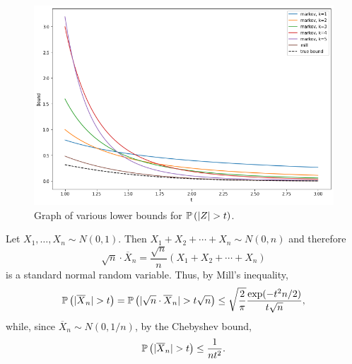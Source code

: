 \begin{ex}
  \inputminted{python}{src/04-06.py}

  \begin{figure}[H]
    \centering
    \includegraphics[scale=0.58]{part1/ch04-06}
    \caption{Graph of various lower bounds for $\P{|Z|>t}$.}
  \end{figure}
\end{ex}

\begin{ex}
  Let $X_1,\ldots,X_n\sim N(0,1)$. Then $X_1+X_2+\cdots+X_n\sim N(0, n)$ and
  therefore
  \[
    \sqrt{n}\cdot \overline{X}_n=\frac{\sqrt{n}}{n}\left(X_1+X_2+\cdots+X_n\right)
  \]
  is a standard normal random variable. Thus, by Mill's inequality,
  \[
    \P{|\overline{X}_n|>t}
    =\P{|\sqrt{n}\cdot \overline{X}_n|>t\sqrt{n}}\leq \sqrt{\frac{2}{\pi}}\frac{\exp(-t^2n/2)}{t\sqrt{n}},
  \]
  while, since $\overline{X}_n\sim N(0,1/n)$, by the Chebyshev bound,
  \[
    \P{|\overline{X}_n|>t}\leq \frac{1}{nt^2}.
  \]
\end{ex}